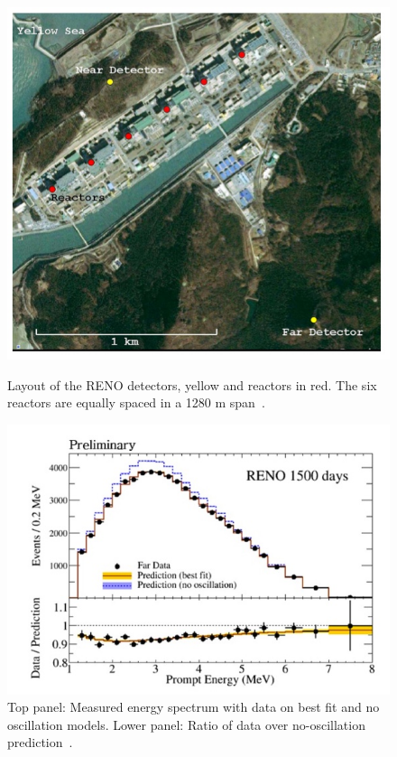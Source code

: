 \begin{figure}[h!]
  \centering
  \begin{minipage}[b]{0.49\textwidth}
    \includegraphics[width=\textwidth]{figures/reno1.jpeg}
    \vspace{2mm}
    \caption{Layout of the RENO detectors, yellow and reactors in red. The six reactors are equally spaced in a 1280 m span~\cite{73Reno}.}
    \label{fig:reno1}
  \end{minipage}
  \hfill
  \begin{minipage}[b]{0.49\textwidth}
    \includegraphics[width=\textwidth]{figures/reno2.jpeg}
       \vspace{2mm}
    \caption{Top panel: Measured energy spectrum with data on best fit and no oscillation models. Lower panel: Ratio of data over no-oscillation prediction~\cite{73Reno}.}
     \label{fig:reno2}
  \end{minipage}
\end{figure}

